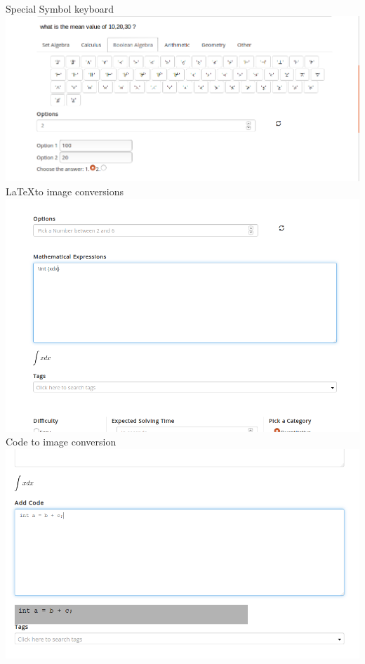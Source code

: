 \documentclass[a4paper,12pt,oneside]{book}
\begin{document}
\vspace{2in}
Special Symbol keyboard\\
\includegraphics[scale=0.4]{compose4.png}	\\

\vspace{0.7in}
\LaTeX to image conversions\\
\includegraphics[scale=0.4]{compose5.png}	\\

\vspace{2in}
Code to image conversion \\
\includegraphics[scale=0.45]{compose7.png}	\\
\end{document}
